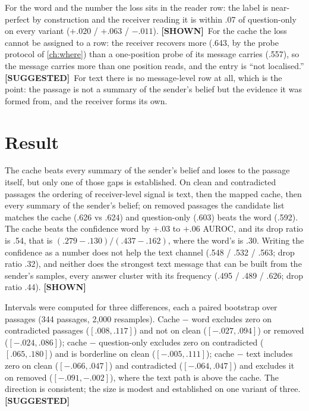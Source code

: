 \documentclass[11pt,a4paper]{report}
\newcommand{\SHOWN}{\textcolor{shownc}{\textbf{\scriptsize[SHOWN]}}}
\newcommand{\SUGG}{\textcolor{suggc}{\textbf{\scriptsize[SUGGESTED]}}}
\begin{document}
For the word and the number the loss sits in the reader row: the label is near-perfect by construction and the receiver reading it is within .07 of question-only on every variant ($+.020$ / $+.063$ / $-.011$). \SHOWN\ For the cache the loss cannot be assigned to a row: the receiver recovers more (.643, by the probe protocol of \cref{ch:where}) than a one-position probe of its message carries (.557), so the message carries more than one position reads, and the entry is ``not localised.'' \SUGG\ For text there is no message-level row at all, which is the point: the passage is not a summary of the sender's belief but the evidence it was formed from, and the receiver forms its own.

\section{Result}

The cache beats every summary of the sender's belief and loses to the passage itself, but only one of those gaps is established. On clean and contradicted passages the ordering of receiver-level signal is text, then the mapped cache, then every summary of the sender's belief; on removed passages the candidate list matches the cache (.626 vs .624) and question-only (.603) beats the word (.592). The cache beats the confidence word by $+.03$ to $+.06$ AUROC, and its drop ratio is .54, that is $(.279 - .130) / (.437 - .162)$, where the word's is .30. Writing the confidence as a number does not help the text channel (.548 / .532 / .563; drop ratio .32), and neither does the strongest text message that can be built from the sender's samples, every answer cluster with its frequency (.495 / .489 / .626; drop ratio .44). \SHOWN

Intervals were computed for three differences, each a paired bootstrap over passages (344 passages, 2,000 resamples). Cache $-$ word excludes zero on contradicted passages ($[.008, .117]$) and not on clean ($[-.027, .094]$) or removed ($[-.024, .086]$); cache $-$ question-only excludes zero on contradicted ($[.065, .180]$) and is borderline on clean ($[-.005, .111]$); cache $-$ text includes zero on clean ($[-.066, .047]$) and contradicted ($[-.064, .047]$) and excludes it on removed ($[-.091, -.002]$), where the text path is above the cache. The direction is consistent; the size is modest and established on one variant of three. \SUGG
\end{document}
